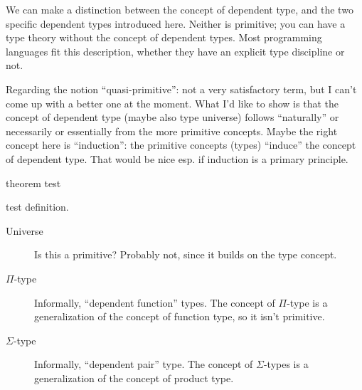 \begin{ednote}
  We can make a distinction between the concept of dependent type, and
  the two specific dependent types introduced here.  Neither is
  primitive; you can have a type theory without the concept of
  dependent types.  Most programming languages fit this description,
  whether they have an explicit type discipline or not.
\end{ednote}

\begin{ednote}
  Regarding the notion ``quasi-primitive'': not a very satisfactory
  term, but I can't come up with a better one at the moment.  What I'd
  like to show is that the concept of dependent type (maybe also type
  universe) follows ``naturally'' or necessarily or essentially from
  the more primitive concepts.  Maybe the right concept here is
  ``induction'': the primitive concepts (types) ``induce'' the concept
  of dependent type.  That would be nice esp. if induction is a
  primary principle.
\end{ednote}

\begin{theorem}
  theorem test
\end{theorem}

\begin{definition}
  test definition.
\end{definition}

\begin{description}

\item [Universe]  Is this a primitive?  Probably not, since it builds on the type concept.

\item [\(\Pi\)-type] Informally, ``dependent function''
  types.  The concept of \(\Pi\)-type is a generalization of the
  concept of function type, so it isn't primitive.

\item [\(\Sigma\)-type] Informally, ``dependent pair''
  type.
  The concept of \(\Sigma\)-types is a generalization of the concept
  of product type.

\end{description}

